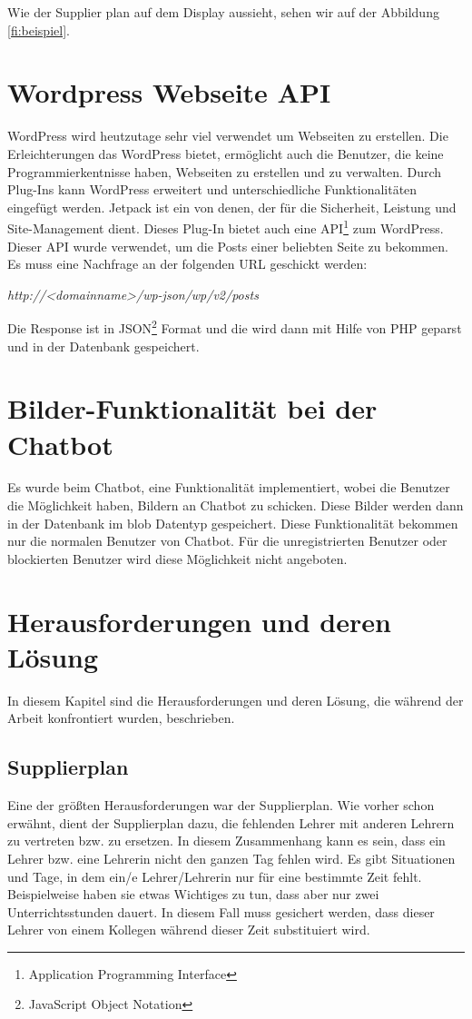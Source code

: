 Wie der Supplier plan auf dem Display aussieht, sehen wir auf der Abbildung \ref{fi:beispiel}.

\section{Wordpress Webseite API}


WordPress wird heutzutage sehr viel verwendet um Webseiten zu erstellen. Die Erleichterungen das WordPress bietet, ermöglicht auch die Benutzer, die keine Programmierkentnisse haben, Webseiten zu erstellen und zu verwalten. Durch Plug-Ins kann WordPress erweitert und unterschiedliche Funktionalitäten eingefügt werden. Jetpack ist ein von denen, der für die Sicherheit, Leistung und Site-Management dient. Dieses Plug-In bietet auch eine API\footnote{Application Programming Interface} zum WordPress. Dieser API wurde verwendet, um die Posts einer beliebten Seite zu bekommen. Es muss eine Nachfrage an der folgenden URL geschickt werden:


\begin{center}
	\textit{http://\textless{}\textit{domainname}\textgreater{}/wp-json/wp/v2/posts}
	
\end{center}


Die Response ist in JSON\footnote{JavaScript Object Notation} Format und die wird dann mit Hilfe von PHP geparst und in der Datenbank gespeichert. 

\section{Bilder-Funktionalität bei der Chatbot}
Es wurde beim Chatbot, eine Funktionalität implementiert, wobei die Benutzer die Möglichkeit haben, Bildern an Chatbot zu schicken. Diese Bilder werden dann in der Datenbank im blob Datentyp gespeichert. Diese Funktionalität bekommen nur die normalen Benutzer von Chatbot. Für die unregistrierten Benutzer oder blockierten Benutzer wird diese Möglichkeit nicht angeboten.

\section{Herausforderungen und deren Lösung}

In diesem Kapitel sind die Herausforderungen und deren Lösung, die während der Arbeit konfrontiert wurden, beschrieben.

\subsection{Supplierplan}
Eine der größten Herausforderungen war der Supplierplan. Wie vorher schon erwähnt, dient der Supplierplan  dazu, die fehlenden Lehrer mit anderen Lehrern zu vertreten bzw. zu ersetzen. In diesem Zusammenhang kann es sein, dass ein Lehrer bzw. eine Lehrerin nicht den ganzen Tag fehlen wird. Es gibt Situationen und Tage, in dem ein/e Lehrer/Lehrerin nur für eine bestimmte Zeit fehlt. Beispielweise haben sie etwas Wichtiges zu tun, dass aber nur zwei Unterrichtsstunden dauert. In diesem Fall muss gesichert werden, dass dieser Lehrer von einem Kollegen während dieser Zeit substituiert wird.


